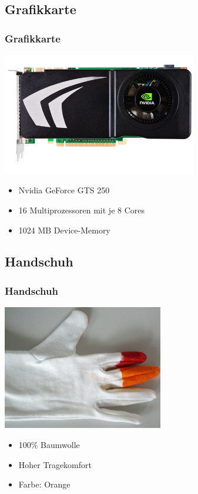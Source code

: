 \documentclass{beamer}
\begin{document}
\subsection{Grafikkarte}
\begin{frame}
\frametitle{Grafikkarte}

\hspace*{1.8cm}\includegraphics[width=8.5cm]{gts250.png}

\begin{itemize}
	\item Nvidia GeForce GTS 250
	\item 16 Multiprozessoren mit je 8 Cores
	\item 1024 MB Device-Memory	
\end{itemize}
\end{frame}

\subsection{Handschuh}
\begin{frame}
\frametitle{Handschuh}

\hspace*{2.5cm}\includegraphics[width=7cm]{handschuh.png}

\begin{itemize}
	\item 100\% Baumwolle
	\item Hoher Tragekomfort
	\item Farbe: Orange
\end{itemize}
\end{frame}
\end{document}
